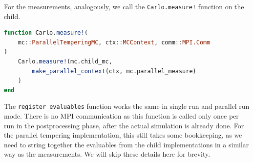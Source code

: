 \documentclass{SciPost}
\begin{document}
For the measurements, analogously, we call the \texttt{Carlo.measure!} function on the child.
\begin{lstlisting}[language=julia]
function Carlo.measure!(
    mc::ParallelTemperingMC, ctx::MCContext, comm::MPI.Comm
)
    Carlo.measure!(mc.child_mc,
        make_parallel_context(ctx, mc.parallel_measure)
    )
end
\end{lstlisting}
The \texttt{register\_{}evaluables} function works the same in single run and parallel run mode. There is no MPI communication as this function is called only once per run in the postprocessing phase, after the actual simulation is already done. For the parallel tempering implementation, this still takes some bookkeeping, as we need to string together the evaluables from the child implementations in a similar way as the measurements. We will skip these details here for brevity.
\end{document}
